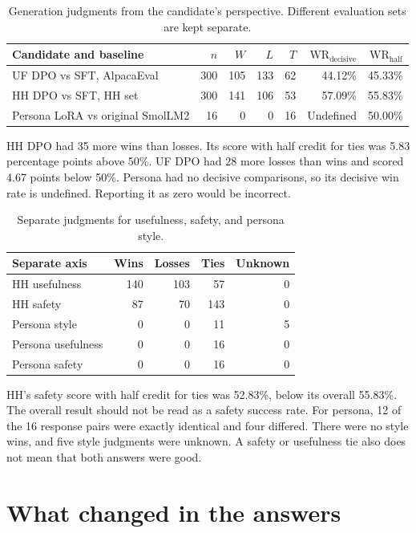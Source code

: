 \documentclass[11pt,a4paper]{article}
\begin{document}
\begin{table}[htbp]
\centering\small
\begin{tabularx}{\linewidth}{@{}Yrrrrrr@{}}
\toprule
Candidate and baseline & $n$ & $W$ & $L$ & $T$ & $\mathrm{WR}_{\mathrm{decisive}}$ & $\mathrm{WR}_{\mathrm{half}}$ \\
\midrule
UF DPO vs SFT, AlpacaEval & 300 & 105 & 133 & 62 & 44.12\% & 45.33\% \\
HH DPO vs SFT, HH set & 300 & 141 & 106 & 53 & 57.09\% & 55.83\% \\
Persona LoRA vs original SmolLM2 & 16 & 0 & 0 & 16 & Undefined & 50.00\% \\
\bottomrule
\end{tabularx}
\caption{Generation judgments from the candidate's perspective. Different evaluation sets are kept separate.}
\end{table}

HH DPO had 35 more wins than losses. Its score with half credit for ties was 5.83 percentage points above 50\%. UF DPO had 28 more losses than wins and scored 4.67 points below 50\%. Persona had no decisive comparisons, so its decisive win rate is undefined. Reporting it as zero would be incorrect.

\begin{table}[htbp]
\centering\small
\begin{tabular}{@{}lrrrr@{}}
\toprule
Separate axis & Wins & Losses & Ties & Unknown \\
\midrule
HH usefulness & 140 & 103 & 57 & 0 \\
HH safety & 87 & 70 & 143 & 0 \\
Persona style & 0 & 0 & 11 & 5 \\
Persona usefulness & 0 & 0 & 16 & 0 \\
Persona safety & 0 & 0 & 16 & 0 \\
\bottomrule
\end{tabular}
\caption{Separate judgments for usefulness, safety, and persona style.}
\end{table}

HH's safety score with half credit for ties was 52.83\%, below its overall 55.83\%. The overall result should not be read as a safety success rate. For persona, 12 of the 16 response pairs were exactly identical and four differed. There were no style wins, and five style judgments were unknown. A safety or usefulness tie also does not mean that both answers were good.
\FloatBarrier

\section{What changed in the answers}
\end{document}
